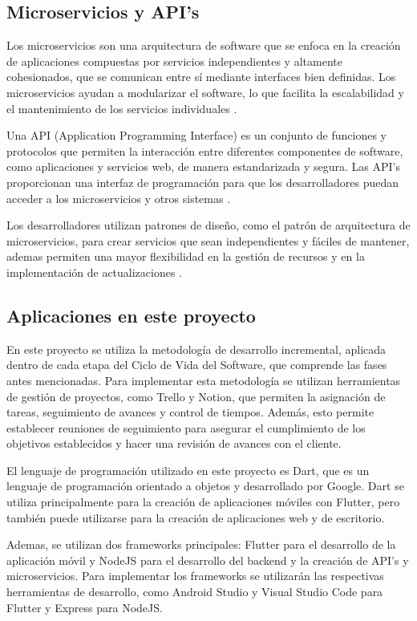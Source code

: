 \documentclass[runningheads]{llncs}
\begin{document}
\subsection{Microservicios y API’s}
Los microservicios son una arquitectura de software que se enfoca en la creación de aplicaciones compuestas por servicios independientes y altamente cohesionados, que se comunican entre sí mediante interfaces bien definidas. Los microservicios ayudan a modularizar el software, lo que facilita la escalabilidad y el mantenimiento de los servicios individuales \cite{Cita15}.

Una API (Application Programming Interface) es un conjunto de funciones y protocolos que permiten la interacción entre diferentes componentes de software, como aplicaciones y servicios web, de manera estandarizada y segura. Las API’s proporcionan una interfaz de programación para que los desarrolladores puedan acceder a los microservicios y otros sistemas \cite{Cita16}.

 Los desarrolladores utilizan patrones de diseño, como el patrón de arquitectura de microservicios, para crear servicios que sean independientes y fáciles de mantener, ademas permiten una mayor flexibilidad en la gestión de recursos y en la implementación de actualizaciones .

\subsection{Aplicaciones en este proyecto}

En este proyecto se utiliza la metodología de desarrollo incremental, aplicada dentro de cada etapa del Ciclo de Vida del Software, que comprende las fases antes mencionadas. Para implementar esta metodología se utilizan herramientas de gestión de proyectos, como Trello y Notion, que permiten la asignación de tareas, seguimiento de avances y control de tiempos. Además, esto permite establecer reuniones de seguimiento para asegurar el cumplimiento de los objetivos establecidos y hacer una revisión de avances con el cliente.

El lenguaje de programación utilizado en este proyecto es Dart, que es un lenguaje de programación orientado a objetos y desarrollado por Google. Dart se utiliza principalmente para la creación de aplicaciones móviles con Flutter, pero también puede utilizarse para la creación de aplicaciones web y de escritorio. 

Ademas, se utilizan dos frameworks principales: Flutter para el desarrollo de la aplicación móvil y NodeJS para el desarrollo del backend y la creación de API's y microservicios. Para implementar los frameworks se utilizarán las respectivas herramientas de desarrollo, como Android Studio y Visual Studio Code para Flutter y Express para NodeJS. 
\end{document}
